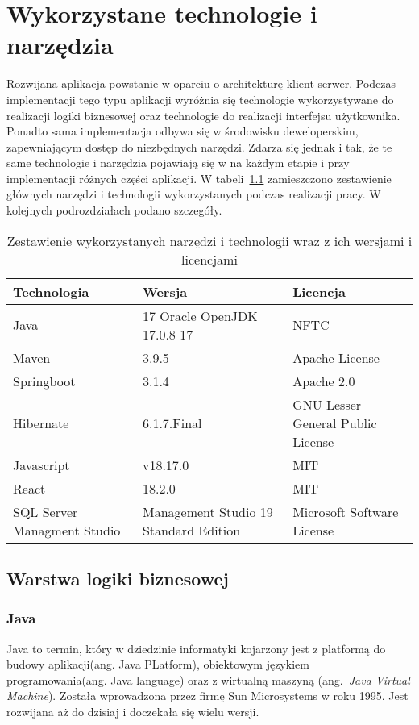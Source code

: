 \chapter{Wykorzystane technologie i narzędzia}
Rozwijana aplikacja powstanie w oparciu o architekturę klient-serwer. Podczas implementacji tego typu aplikacji wyróżnia się technologie wykorzystywane do realizacji logiki biznesowej oraz technologie do realizacji interfejsu użytkownika. Ponadto sama implementacja odbywa się w środowisku deweloperskim, zapewniającym dostęp do niezbędnych narzędzi. Zdarza się jednak i tak, że te same technologie i narzędzia pojawiają się w na każdym etapie i przy implementacji różnych części aplikacji.
W tabeli~\ref{tab:zestawienie_narzędzi} zamieszczono zestawienie głównych narzędzi i technologii wykorzystanych podczas realizacji pracy.
W kolejnych podrozdziałach podano szczegóły.


\begin{table}[htb] \small
	\centering
\caption{Zestawienie wykorzystanych narzędzi i technologii wraz z ich wersjami i licencjami}
\label{tab:zestawienie_narzędzi}
\begin{tabularx}{\linewidth}{|X|X|X|}
    \hline
    Technologia & Wersja & Licencja \\
    \hline \hline
    Java & 17 Oracle OpenJDK 17.0.8 17 &  NFTC\\
    \hline
    Maven & 3.9.5 & Apache License\\
    \hline
    Springboot & 3.1.4 & Apache 2.0\\
    \hline
    Hibernate & 6.1.7.Final & GNU Lesser General Public License \\
    \hline
		Javascript & v18.17.0 & MIT \\
    \hline
		React & 18.2.0 & MIT \\
    \hline
		SQL Server Managment Studio & Management Studio 19 Standard Edition & Microsoft Software License\\

    \hline
\end{tabularx}
\end{table}

\section{Warstwa logiki biznesowej}
\subsection{Java}
Java to termin, który w dziedzinie informatyki kojarzony jest z platformą do budowy aplikacji(ang. Java PLatform), obiektowym językiem programowania(ang. Java language) oraz z wirtualną maszyną (ang.~\emph{Java Virtual Machine}). Została wprowadzona przez firmę Sun Microsystems w roku 1995. Jest rozwijana aż do dzisiaj i doczekała się wielu wersji. 

